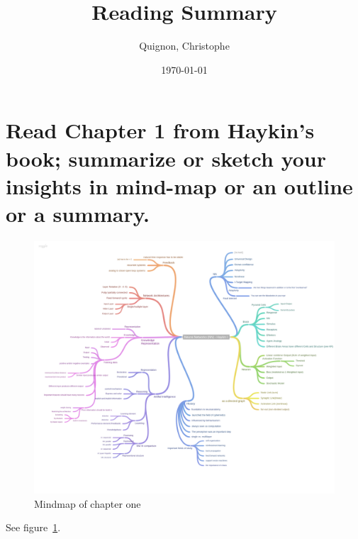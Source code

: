 \documentclass{scrartcl}
\begin{document}
\title{Reading Summary}
\subtitle{}
\author{
  Quignon, Christophe \\
} 
\date{\today}


\maketitle

\section{Read Chapter 1 from Haykin’s book; summarize or sketch your insights in mind-map or an outline or a summary.}

\begin{figure}
 \center
 \includegraphics[width= \textwidth]{mindmap.png}
 \caption{Mindmap of chapter one}
 \label{fig:mindmap}
\end{figure}

See figure~\ref{fig:mindmap}.
\end{document}
